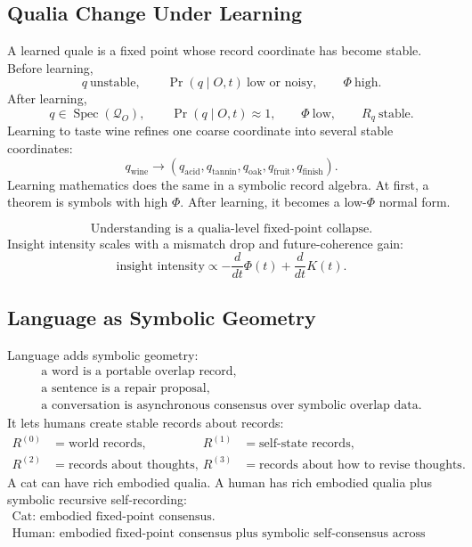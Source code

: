 \documentclass[11pt]{article}
\theoremstyle{remark}
\theoremstyle{plain}
\begin{document}
\subsection{Qualia Change Under Learning}

A learned quale is a fixed point whose record coordinate has become stable. Before learning,
\[
q\ \text{unstable},\qquad
\Pr(q\mid O,t)\ \text{low or noisy},\qquad
\Phi\ \text{high}.
\]
After learning,
\[
q\in\operatorname{Spec}(\mathcal Q_O),
\qquad
\Pr(q\mid O,t)\approx 1,
\qquad
\Phi\ \text{low},
\qquad
R_q\ \text{stable}.
\]
Learning to taste wine refines one coarse coordinate into several stable coordinates:
\[
q_{\mathrm{wine}}
\to
(q_{\mathrm{acid}},q_{\mathrm{tannin}},q_{\mathrm{oak}},
q_{\mathrm{fruit}},q_{\mathrm{finish}}).
\]
Learning mathematics does the same in a symbolic record algebra. At first, a theorem is symbols with high \(\Phi\). After learning, it becomes a low-\(\Phi\) normal form.

\[
\boxed{
\text{Understanding is a qualia-level fixed-point collapse.}
}
\]
Insight intensity scales with a mismatch drop and future-coherence gain:
\[
\text{insight intensity}
\propto
-\frac{d}{dt}\Phi(t)
+
\frac{d}{dt}K(t).
\]

\subsection{Language as Symbolic Geometry}

Language adds symbolic geometry:
\[
\begin{gathered}
\boxed{
\text{a word is a portable overlap record},
}
\\[0.35em]
\boxed{
\text{a sentence is a repair proposal},
}
\\[0.35em]
\boxed{
\text{a conversation is asynchronous consensus over symbolic overlap data}.
}
\end{gathered}
\]
It lets humans create stable records about records:
\[
\begin{aligned}
R^{(0)}&=\text{world records},&
R^{(1)}&=\text{self-state records},\\
R^{(2)}&=\text{records about thoughts},&
R^{(3)}&=\text{records about how to revise thoughts}.
\end{aligned}
\]
A cat can have rich embodied qualia. A human has rich embodied qualia plus symbolic recursive self-recording:
\[
\begin{gathered}
\boxed{
\text{Cat: embodied fixed-point consensus.}
}
\\[0.35em]
\boxed{
\text{Human: embodied fixed-point consensus plus symbolic self-consensus across time.}
}
\end{gathered}
\]
\end{document}
